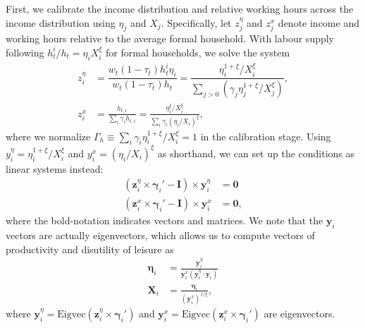 \documentclass[a4paper]{article}
\begin{document}
First, we calibrate the income distribution and relative working hours across the income distribution using $\eta_j$ and $X_j$. Specifically, let $z_j^{\eta}$ and $z_j^{x}$ denote income and working hours relative to the average formal household. With labour supply following $h_t^i/h_t = \eta_iX_i^{\xi}$ for formal households, we solve the system
\begin{align*}
        z_i^{\eta} &= \dfrac{w_t(1-\tau_t)h_t^i \eta_i}{w_t(1-\tau_t)h_t} = \dfrac{\eta_i^{1+\xi}/X_i^{\xi}}{\sum_{j>0} \left(\gamma_ j\eta_j^{1+\xi}/X_j^{\xi}\right)},  \\
        z_i^{x} &= \frac{h_{t,i}}{\sum_i\gamma_i h_{t,i}} = \frac{\eta_i^{\xi}/X_i^{\xi}}{\sum_i \gamma_i(\eta_i/X_i)^{\xi}},
\end{align*}
where we normalize $\Gamma_h \equiv \sum_i \gamma_i\eta_i^{1+\xi}/X_i^{\xi} = 1$ in the calibration stage. Using $y_i^{\eta} = \eta_i^{1+\xi}/X_i^{\xi}$ and $y_i^x = (\eta_i/X_i)^{\xi}$ as shorthand, we can set up the conditions as linear systems instead:
\begin{align*}
    \left(\bm{z}_i^{\eta} \times \bm{\gamma}_i'-\bm{I}\right)\times \bm{y}_i^{\eta} &= \bm{0} \\
    \left(\bm{z}_i^{x} \times \bm{\gamma}_i'-\bm{I}\right)\times \bm{y}_i^{x} &= \bm{0},
\end{align*}
where the bold-notation indicates vectors and matrices. We note that the $\bm{y}_i$ vectors are actually eigenvectors, which allows us to compute vectors of productivity and disutility of leisure as
\begin{align}
    \bm{\eta}_i &= \frac{\bm{y}^{\eta}_i}{\bm{y}_i^x \left(\bm{y}_i^{\eta} \cdot \bm{y}_i\right)} \label{\refeq:calibration:etai} \\
    \bm{X}_i &= \frac{\bm{\eta}_i}{(\bm{y}_i^x)^{1/\xi}}, \label{\refeq:calibration:Xi}
\end{align}
where $\bm{y}_i^{\eta} = \text{Eigvec}(\bm{z}_i^{\eta}\times \bm{\gamma}_i')$ and $\bm{y}_i^{x} = \text{Eigvec}(\bm{z}_i^{x}\times \bm{\gamma}_i')$ are eigenvectors.
\end{document}
